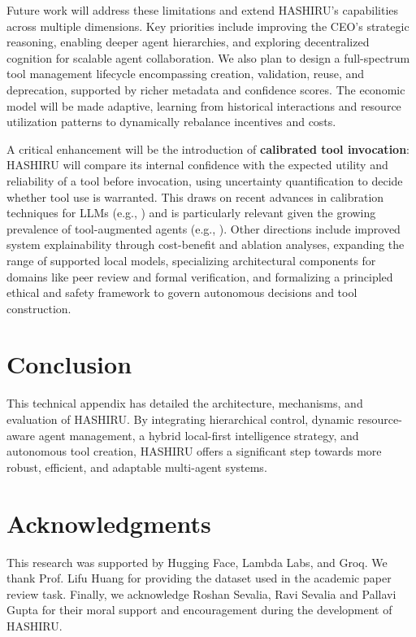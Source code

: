 \documentclass[twocolumn]{article}
\begin{document}
Future work will address these limitations and extend HASHIRU's capabilities across multiple dimensions. Key priorities include improving the CEO's strategic reasoning, enabling deeper agent hierarchies, and exploring decentralized cognition for scalable agent collaboration. We also plan to design a full-spectrum tool management lifecycle encompassing creation, validation, reuse, and deprecation, supported by richer metadata and confidence scores. The economic model will be made adaptive, learning from historical interactions and resource utilization patterns to dynamically rebalance incentives and costs.

A critical enhancement will be the introduction of \textbf{calibrated tool invocation}: HASHIRU will compare its internal confidence with the expected utility and reliability of a tool before invocation, using uncertainty quantification to decide whether tool use is warranted. This draws on recent advances in calibration techniques for LLMs (e.g., \cite{manggalaqa, spiess2024calibration}) and is particularly relevant given the growing prevalence of tool-augmented agents (e.g., \cite{Qin2023ToolLLM}). Other directions include improved system explainability through cost-benefit and ablation analyses, expanding the range of supported local models, specializing architectural components for domains like peer review and formal verification, and formalizing a principled ethical and safety framework to govern autonomous decisions and tool construction.
\section{Conclusion}
This technical appendix has detailed the architecture, mechanisms, and evaluation of HASHIRU. By integrating hierarchical control, dynamic resource-aware agent management, a hybrid local-first intelligence strategy, and autonomous tool creation, HASHIRU offers a significant step towards more robust, efficient, and adaptable multi-agent systems.

\section*{Acknowledgments}
This research was supported by Hugging Face, Lambda Labs, and Groq. We thank Prof. Lifu Huang for providing the dataset used in the academic paper review task. Finally, we acknowledge Roshan Sevalia, Ravi Sevalia and Pallavi Gupta for their moral support and encouragement during the development of HASHIRU.



\end{document}
